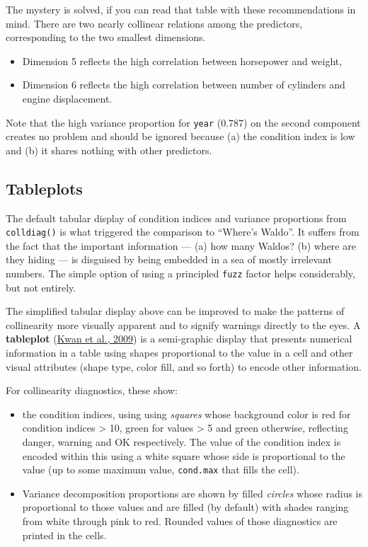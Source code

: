 \documentclass[
  letterpaper,
  10pt,
  krantz2]{krantz}
\providecommand{\tightlist}{%
  \setlength{\itemsep}{0pt}\setlength{\parskip}{0pt}}\usepackage{longtable,booktabs,array}
\begin{document}
The mystery is solved, if you can read that table with these
recommendations in mind. There are two nearly collinear relations among
the predictors, corresponding to the two smallest dimensions.

\begin{itemize}
\tightlist
\item
  Dimension 5 reflects the high correlation between horsepower and
  weight,
\item
  Dimension 6 reflects the high correlation between number of cylinders
  and engine displacement.
\end{itemize}

Note that the high variance proportion for \texttt{year} (0.787) on the
second component creates no problem and should be ignored because (a)
the condition index is low and (b) it shares nothing with other
predictors.

\hypertarget{tableplots}{%
\subsection{Tableplots}\label{tableplots}}

The default tabular display of condition indices and variance
proportions from \texttt{colldiag()} is what triggered the comparison to
``Where's Waldo''. It suffers from the fact that the important
information --- (a) how many Waldos? (b) where are they hiding --- is
disguised by being embedded in a sea of mostly irrelevant numbers. The
simple option of using a principled \texttt{fuzz} factor helps
considerably, but not entirely.

The simplified tabular display above can be improved to make the
patterns of collinearity more visually apparent and to signify warnings
directly to the eyes. A \textbf{tableplot}
(\protect\hyperlink{ref-Kwan-etal:2009}{Kwan et al., 2009}) is a
semi-graphic display that presents numerical information in a table
using shapes proportional to the value in a cell and other visual
attributes (shape type, color fill, and so forth) to encode other
information.

For collinearity diagnostics, these show:

\begin{itemize}
\item
  the condition indices, using using \emph{squares} whose background
  color is red for condition indices \textgreater{} 10, green for values
  \textgreater{} 5 and green otherwise, reflecting danger, warning and
  OK respectively. The value of the condition index is encoded within
  this using a white square whose side is proportional to the value (up
  to some maximum value, \texttt{cond.max} that fills the cell).
\item
  Variance decomposition proportions are shown by filled \emph{circles}
  whose radius is proportional to those values and are filled (by
  default) with shades ranging from white through pink to red. Rounded
  values of those diagnostics are printed in the cells.
\end{itemize}
\end{document}

